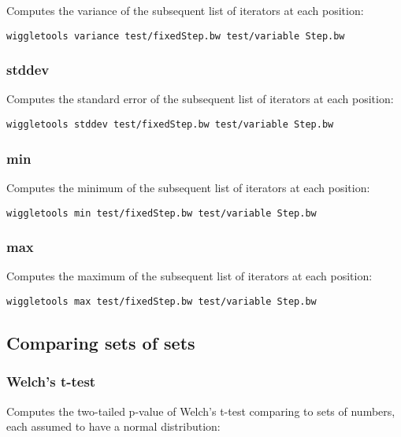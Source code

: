 \documentclass[12pt]{article}
\begin{document}
Computes the variance of the subsequent list of iterators at each position:

\begin{verbatim}
wiggletools variance test/fixedStep.bw test/variable Step.bw 
\end{verbatim}

\subsubsection{stddev}

Computes the standard error of the subsequent list of iterators at each position:

\begin{verbatim}
wiggletools stddev test/fixedStep.bw test/variable Step.bw 
\end{verbatim}

\subsubsection{min}


Computes the minimum of the subsequent list of iterators at each position:

\begin{verbatim}
wiggletools min test/fixedStep.bw test/variable Step.bw 
\end{verbatim}

\subsubsection{max}

Computes the maximum of the subsequent list of iterators at each position:

\begin{verbatim}
wiggletools max test/fixedStep.bw test/variable Step.bw 
\end{verbatim}

\subsection{Comparing sets of sets}

\subsubsection{Welch's t-test}

Computes the two-tailed p-value of Welch's t-test comparing to sets of numbers, each assumed to have a normal distribution:
\end{document}
